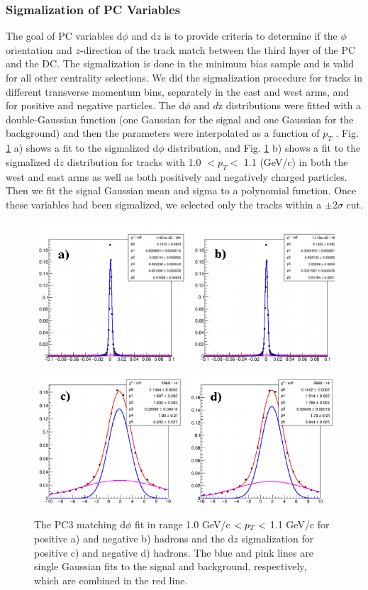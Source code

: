 \subsubsection{Sigmalization of PC Variables}
\label{sec:pc_sigmala}
The goal of PC variables d$\phi$ and d$z$ is to provide criteria to determine if the $\phi$ orientation and $z$-direction of the track match between the third layer of the PC and the DC. The sigmalization is done in the minimum bias sample and is valid for all other centrality selections.
We did the sigmalization procedure for tracks in different transverse momentum bins, separately in the east
and west arms, and for positive and negative particles. The d$\phi$ and $d$z distributions
were fitted with a double-Gaussian function (one Gaussian for the signal and one Gaussian for the background) and then the parameters were interpolated as
a function of $p_T$ . Fig. \ref{fig:pc3_sig} a) shows a fit to the sigmalized
d$\phi$ distribution, and Fig. \ref{fig:pc3_sig} b) shows a fit to the sigmalized d$z$ distribution for tracks with 1.0 $< p_T <$ 1.1 (GeV/c)
in both the west and east arms as well as both positively and negatively charged particles.
Then we fit the signal Gaussian mean and sigma to a polynomial function.  Once these variables had been sigmalized, we selected only
the tracks within a $\pm$2$\sigma$ cut.

\begin{figure}[!ht]
\begin{center}
\includegraphics[scale=0.55]{figs/pc3dphi.png}
\includegraphics[scale=0.55]{figs/pc3dz.png}
\end{center}
\caption{The PC3 matching d$\phi$ fit in range 1.0 GeV/c $< \mbox{$p_T$} <$ 1.1 GeV/c for positive a) and negative b) hadrons and the d$z$ sigmalization for positive c) and negative d) hadrons. The blue and pink lines are single Gaussian fits to the signal and background, respectively, which are combined in the red line.
}
\label{fig:pc3_sig}
\end{figure}

